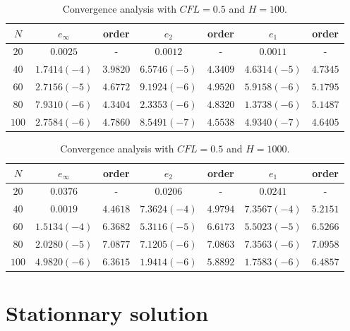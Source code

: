 \documentclass[10pt,a4paper]{amsart}
\begin{document}
\begin{table}
\begin{tabular}{c|c|c|c|c|c|c}
$N$ & $e_{\infty}$ & order & $e_2$ & order & $e_1$ & order \\ 
\hline 
\hline
$20$ & $0.0025$ & - & $0.0012$ & - & $0.0011$ & - \\ 
\hline 
$40$ & $1.7414 (-4)$ & $3.9820$ & $6.5746 (-5)$ & $4.3409$ & $4.6314 (-5)$ & $4.7345$ \\ 
\hline 
$60$ & $2.7156 (-5)$ & $4.6772$ & $9.1924 (-6)$ & $4.9520$ & $5.9158 (-6)$ & $5.1795$ \\
\hline 
$80$ & $7.9310 (-6)$ & $4.3404$ & $2.3353 (-6)$ & $4.8320$ & $1.3738 (-6)$ & $5.1487$ \\ 
\hline 
$100$ & $2.7584(-6)$ & $4.7860$ & $8.5491 (-7)$ & $4.5538$ & $4.9340 (-7)$ & $4.6405$  \\ 
\end{tabular} 
\caption{Convergence analysis with $CFL=0.5$ and $H=100$.}
\label{CV_order8_hp100}
\end{table}

\begin{table}
\begin{tabular}{c|c|c|c|c|c|c}
$N$ & $e_{\infty}$ & order & $e_2$ & order & $e_1$ & order \\ 
\hline 
\hline
$20$ & $0.0376$ & - & $0.0206$ & - & $0.0241$ & - \\ 
\hline 
$40$ & $0.0019$ & $4.4618$ & $7.3624 (-4)$ & $4.9794$ & $7.3567 (-4)$ & $5.2151$ \\ 
\hline 
$60$ & $1.5134 (-4)$ & $6.3682$ & $5.3116 (-5)$ & $6.6173$ & $5.5023 (-5)$ & $6.5266$ \\
\hline 
$80$ & $2.0280 (-5)$ & $7.0877$ & $7.1205 (-6)$ & $7.0863$ & $7.3563 (-6)$ & $7.0958$ \\ 
\hline 
$100$ & $4.9820(-6)$ & $6.3615$ & $1.9414 (-6)$ & $5.8892$ & $1.7583 (-6)$ & $6.4857$  \\ 
\end{tabular} 
\caption{Convergence analysis with $CFL=0.5$ and $H=1000$.}
\label{CV_order8_hp1000}
\end{table}







\section{Stationnary solution}
\end{document}
